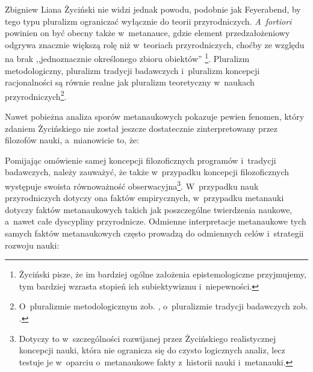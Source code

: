 \begin{artplenv}{Zbigniew Liana}
Życiński nie widzi jednak powodu, podobnie jak Feyerabend, by tego typu pluralizm ograniczać wyłącznie do teorii przyrodniczych. \textit{A~fortiori} powinien on być obecny także w~metanauce, gdzie element przedzałożeniowy odgrywa znacznie większą rolę niż w~teoriach przyrodniczych, choćby ze względu na brak ,,jednoznacznie określonego zbioru obiektów''
\parencite[][s.~163]{zycinski_teizm_1985}%
\footnote{Życiński 
\parencites*[][s.~143]{zycinski_structure_1988}[][s.~254]{zycinski_struktura_2013_liana} %
 pisze, że im bardziej ogólne założenia epistemologiczne przyjmujemy, tym bardziej wzrasta stopień ich subiektywizmu i~niepewności.}. Pluralizm metodologiczny, pluralizm tradycji badawczych i~pluralizm koncepcji racjonalności są równie realne jak pluralizm teoretyczny w~naukach przyrodniczych\footnote{O~pluralizmie metodologicznym zob. 
\parencites[][s.~198]{zycinski_structure_1988}[][s.~343]{zycinski_struktura_2013_liana}, %
 o~pluralizmie tradycji badawczych zob. 
\parencites[][s.~164]{zycinski_teizm_1985}[][s.~184]{zycinski_elementy_1996}[][s.~250]{zycinski_elementy_2015}.%
}.

Nawet pobieżna analiza sporów metanaukowych pokazuje pewien fenomen, który zdaniem Życińskiego nie został jeszcze dostatecznie zinterpretowany przez filozofów nauki, a~mianowicie to, że:


Pomijając omówienie samej koncepcji filozoficznych programów i~tradycji badawczych, należy zauważyć, że także w~przypadku koncepcji filozoficznych występuje swoista równoważność obserwacyjna\footnote{Dotyczy to w~szczególności rozwijanej przez Życińskiego realistycznej koncepcji nauki, która nie ogranicza się do czysto logicznych analiz, lecz testuje je w~oparciu o~metanaukowe fakty z~historii nauki i~metanauki.}. W~przypadku nauk przyrodniczych dotyczy ona faktów empirycznych, w~przypadku metanauki dotyczy faktów metanaukowych takich jak poszczególne twierdzenia naukowe, a~nawet całe dyscypliny przyrodnicze. Odmienne interpretacje metanaukowe tych samych faktów metanaukowych często prowadzą do odmiennych celów i~strategii rozwoju nauki:


\end{artplenv}
